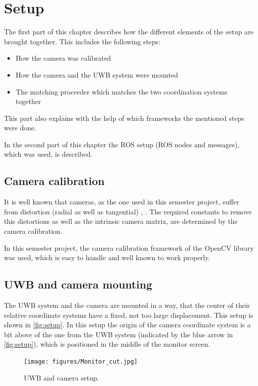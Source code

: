 
\setcounter{chapter}{2}

\chapter{Setup}\label{ch:setup}
The first part of this chapter describes how the different elements of the setup are brought together. This includes the following steps:
\begin{itemize}
	\item How the camera was calibrated
	\item How the camera and the \ac{UWB} system were mounted
	\item The matching proceeder which matches the two coordination systems together
\end{itemize}
This part also explains with the help of which frameworks the mentioned steps were done.

In the second part of this chapter the \ac{ROS} setup (\ac{ROS} nodes and messages), which was used, is described. 

\section{Camera calibration}
It is well known that cameras, as the one used in this semester project, suffer from distortion (radial as well as tangential) \cite{Szeliski:2010:CVA:1941882}, \cite{opencv_library}. The required constants to remove this distortions as well as the intrinsic camera matrix, are determined by the camera calibration.

In this semester project, the camera calibration framework of the OpenCV library \cite{opencv_library} was used, which is easy to handle and well known to work properly.

\section{\ac{UWB} and camera mounting}
The \ac{UWB} system and the camera are mounted in a way, that the center of their relative coordinate systems have a fixed, not too large displacement. This setup is shown in \autoref{fig:setup}. In this setup the origin of the camera coordinate system is a bit above of the one from the \ac{UWB} system (indicated by the blue arrow in \autoref{fig:setup}), which is positioned in the middle of the monitor screen. 

\begin{figure}[h]\centering
	\texttt{[image: figures/Monitor\_cut.jpg]}
	\caption{\ac{UWB} and camera setup.}\label{fig:setup}
\end{figure}


